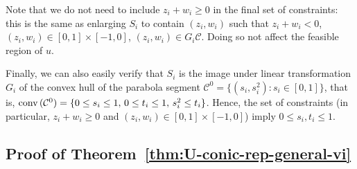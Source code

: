 	Note that we do not need to include $z_i + w_i \geq 0$ in the final set of constraints: this is the same as enlarging $S_i$ to contain $(z_i, w_i)$ such that $z_i + w_i < 0$, $(z_i, w_i)\in [0,1]\times [-1, 0]$, $(z_i, w_i) \in G_i \mathcal{C}$. Doing so not affect the feasible region of $u$.

	Finally, we can also easily verify that $S_i$ is the image under linear transformation $G_i$ of the convex hull of the parabola segment $\mathcal{C}^0 = \{ (s_i, s_i^2): s_i \in [0,1] \}$, that is, 
	$\textnormal{conv}\,(\mathcal{C}^0) = \{ 0\leq s_i \leq 1,\, 0 \leq t_i \leq 1,\, s_i^2 \leq t_i \}$.
	Hence, the set of constraints (in particular, $z_i + w_i \geq 0$ and $(z_i,w_i)\in [0,1] \times [-1,0]$) imply
	$0\leq s_i, t_i \leq 1$.

	\subsection*{Proof of Theorem~\ref{thm:U-conic-rep-general-vi}}


